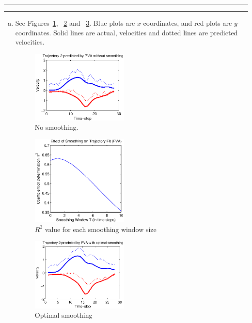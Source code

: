 \documentclass[11pt]{article}
\newcounter{questionCounter}
\newcounter{partCounter}[questionCounter]
\newenvironment{question}[2][\arabic{questionCounter}]{%
    \setcounter{partCounter}{0}%
    \vspace{.25in} \hrule \vspace{0.5em}%
        \noindent{\bf #2}%
    \vspace{0.8em} \hrule \vspace{.10in}%
    \addtocounter{questionCounter}{1}%
}{}
\begin{document}
\begin{question}{Problem 2}
\begin{enumerate}[a.]
\item
See Figures~\ref{fig:2a1}, ~\ref{fig:2a2} and ~\ref{fig:2a3}. Blue plots are
$x$-coordinates, and red plots are $y$-coordinates. Solid lines are actual,
velocities and dotted lines are predicted velocities.
\begin{figure}[h]
\begin{center}
\includegraphics[width=0.46\textwidth]{2a1}
\end{center}
\caption{No smoothing.}
\label{fig:2a1}
\end{figure}
\begin{figure}[h]
\begin{center}
\includegraphics[width=0.46\textwidth]{2a2}
\end{center}
\caption{$R^2$ value for each smoothing window size}
\label{fig:2a2}
\end{figure}
\begin{figure}[h]
\begin{center}
\includegraphics[width=0.46\textwidth]{2a3}
\end{center}
\caption{Optimal smoothing}
\label{fig:2a3}
\end{figure}


\end{enumerate}
\end{question}
\end{document}
